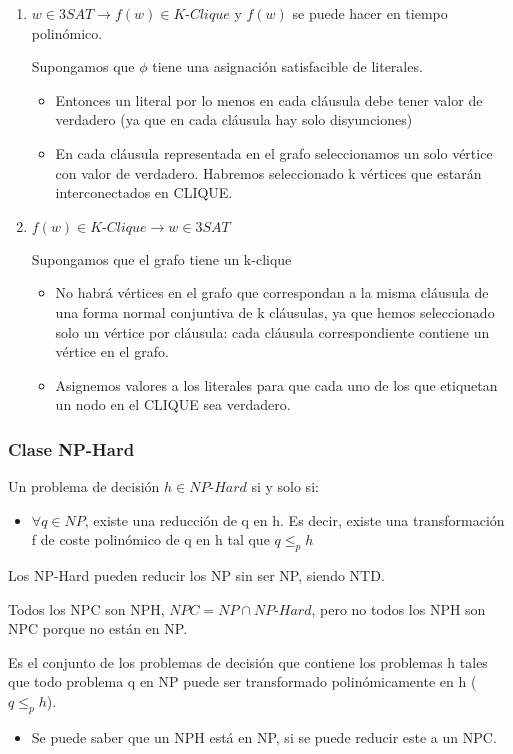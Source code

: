 \begin{enumerate}
  \item $w\in \textit{3SAT} \rightarrow f(w)\in \textit{K-Clique}$ y $f(w)$ se puede hacer en tiempo polinómico.
  
  Supongamos que $\phi$ tiene una asignación satisfacible de literales.
  \begin{itemize}
    \item Entonces un literal por lo menos en cada cláusula debe tener valor de verdadero (ya que en cada cláusula hay solo disyunciones)
    \item En cada cláusula representada en el grafo seleccionamos un solo vértice con valor de verdadero. Habremos seleccionado k vértices que estarán interconectados en CLIQUE.
  \end{itemize}
  \item $f(w)\in \textit{K-Clique} \rightarrow w \in \textit{3SAT}$
  
  Supongamos que el grafo tiene un k-clique
  \begin{itemize}
    \item No habrá vértices en el grafo que correspondan a la misma cláusula de una forma normal conjuntiva de k cláusulas, ya que hemos seleccionado solo un vértice por cláusula: cada cláusula correspondiente contiene un vértice en el grafo.
    \item Asignemos valores a los literales para que cada uno de los que etiquetan un nodo en el CLIQUE sea verdadero.
  \end{itemize}
\end{enumerate}
\pagebreak

\subsubsection{Clase NP-Hard}
Un problema de decisión $h \in \textit{NP-Hard}$ si y solo si:
\begin{itemize}
  \item $\forall q \in NP$, existe una reducción de q en h. Es decir, existe una transformación f de coste polinómico de q en h tal que $q \leq_p h$
\end{itemize}

Los NP-Hard pueden reducir los NP sin ser NP, siendo NTD.

Todos los NPC son NPH, $\textit{NPC}=\textit{NP} \cap \textit{NP-Hard}$, pero no todos los NPH son NPC porque no están en NP.

Es el conjunto de los problemas de decisión que contiene los problemas h tales que todo problema q en NP puede ser transformado polinómicamente en h ($q \leq_p h$).
\begin{itemize}
  \item Se puede saber que un NPH está en NP, si se puede reducir este a un NPC.
\end{itemize}

